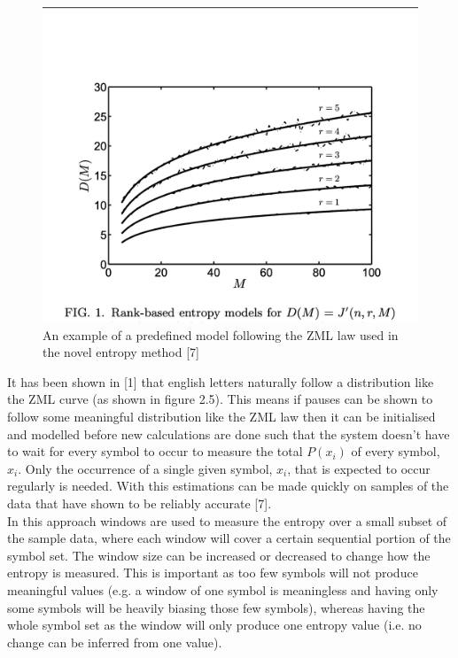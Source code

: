 \begin{figure}[h]
	\center
	\includegraphics[scale=0.5]{src/main-matter/theory/fig/rank-based-entropy-D(M)}
	\caption{An example of a predefined model following the ZML law used in the novel entropy method [7]}
	\label{----}
\end{figure}
It has been shown in [1] that english letters naturally follow a distribution like the ZML curve (as shown in figure 2.5). This means if pauses can be shown to follow some meaningful distribution like the ZML law then it can be initialised and modelled before new calculations are done such that the system doesn't have to wait for every symbol to occur to measure the total $P(x_i)$ of every symbol, $x_i$. Only the occurrence of a single given symbol, $x_i$, that is expected to occur regularly is needed. With this estimations can be made quickly on samples of the data that have shown to be reliably accurate [7]. \\ 

In this approach windows are used to measure the entropy over a small subset of the sample data, where each window will cover a certain sequential portion of the symbol set. The window size can be increased or decreased to change how the entropy is measured. This is important as too few symbols will not produce meaningful values (e.g. a window of one symbol is meaningless and having only some symbols will be heavily biasing those few symbols), whereas having the whole symbol set as the window will only produce one entropy value (i.e. no change can be inferred from one value). \\

